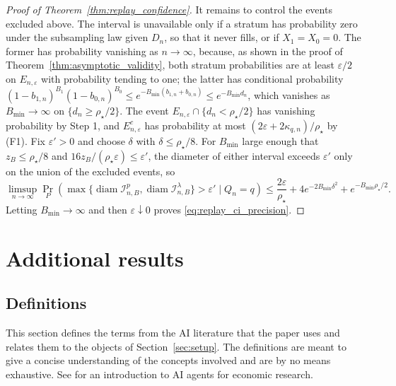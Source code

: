 \documentclass[10pt]{article}
\begin{document}
\begin{proof}[Proof of Theorem~\ref{thm:replay_confidence}]
It remains to control the events excluded above. The interval is unavailable only if a stratum has probability zero under the subsampling law given $D_n$, so that it never fills, or if $X_1=X_0=0$. The former has probability vanishing as $n\to\infty$, because, as shown in the proof of Theorem~\ref{thm:asymptotic_validity}, both stratum probabilities are at least $\varepsilon/2$ on $E_{n,\varepsilon}$ with probability tending to one; the latter has conditional probability $(1-b_{1,n})^{B_1}(1-b_{0,n})^{B_0}\le e^{-B_{\min}(b_{1,n}+b_{0,n})}\le e^{-B_{\min}d_n}$, which vanishes as $B_{\min}\to\infty$ on $\{d_n\ge\rho_\star/2\}$. The event $E_{n,\varepsilon}\cap\{d_n<\rho_\star/2\}$ has vanishing probability by Step 1, and $E_{n,\varepsilon}^c$ has probability at most $(2\varepsilon+2\kappa_{q,n})/\rho_\star$ by (F1). Fix $\varepsilon'>0$ and choose $\delta$ with $\delta\le\rho_\star/8$. For $B_{\min}$ large enough that $z_B\le\rho_\star/8$ and $16z_B/(\rho_\star\varepsilon)\le\varepsilon'$, the diameter of either interval exceeds $\varepsilon'$ only on the union of the excluded events, so
\[
\limsup_{n\to\infty}\Pr_P\!\left(\max\{\operatorname{diam}\mathcal I^p_{n,B},\operatorname{diam}\mathcal I^\lambda_{n,B}\}>\varepsilon'\mid Q_n=q\right)
\le\frac{2\varepsilon}{\rho_\star}+4e^{-2B_{\min}\delta^2}+e^{-B_{\min}\rho_\star/2}.
\]
Letting $B_{\min}\to\infty$ and then $\varepsilon\downarrow0$ proves \eqref{eq:replay_ci_precision}.
\end{proof}

\section{Additional results}\label{app:additional_results}

\subsection{Definitions} \label{app:definitions}

This section defines the terms from the AI literature that the paper uses and relates them to the objects of Section~\ref{sec:setup}. The definitions are meant to give a concise understanding of the concepts involved and are by no means exhaustive. See \citet{korinek2025agents} for an introduction to AI agents for economic research.
\end{document}
